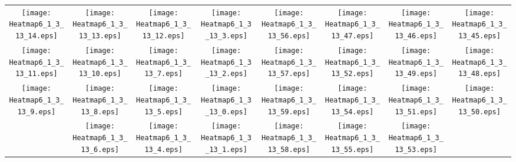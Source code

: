 \documentclass{standalone}
\begin{document}
\begin{tabular}{ *8{c} }
\texttt{[image: Heatmap6\_1\_3\_13\_14.eps]} & \texttt{[image: Heatmap6\_1\_3\_13\_13.eps]} & \texttt{[image: Heatmap6\_1\_3\_13\_12.eps]} & \texttt{[image: Heatmap6\_1\_3\_13\_3.eps]} & \texttt{[image: Heatmap6\_1\_3\_13\_56.eps]} & \texttt{[image: Heatmap6\_1\_3\_13\_47.eps]} & \texttt{[image: Heatmap6\_1\_3\_13\_46.eps]} & \texttt{[image: Heatmap6\_1\_3\_13\_45.eps]} \\
\texttt{[image: Heatmap6\_1\_3\_13\_11.eps]} & \texttt{[image: Heatmap6\_1\_3\_13\_10.eps]} & \texttt{[image: Heatmap6\_1\_3\_13\_7.eps]} & \texttt{[image: Heatmap6\_1\_3\_13\_2.eps]} & \texttt{[image: Heatmap6\_1\_3\_13\_57.eps]} & \texttt{[image: Heatmap6\_1\_3\_13\_52.eps]} & \texttt{[image: Heatmap6\_1\_3\_13\_49.eps]} & \texttt{[image: Heatmap6\_1\_3\_13\_48.eps]} \\
\texttt{[image: Heatmap6\_1\_3\_13\_9.eps]} & \texttt{[image: Heatmap6\_1\_3\_13\_8.eps]} & \texttt{[image: Heatmap6\_1\_3\_13\_5.eps]} & \texttt{[image: Heatmap6\_1\_3\_13\_0.eps]} & \texttt{[image: Heatmap6\_1\_3\_13\_59.eps]} & \texttt{[image: Heatmap6\_1\_3\_13\_54.eps]} & \texttt{[image: Heatmap6\_1\_3\_13\_51.eps]} & \texttt{[image: Heatmap6\_1\_3\_13\_50.eps]} \\
 & \texttt{[image: Heatmap6\_1\_3\_13\_6.eps]} & \texttt{[image: Heatmap6\_1\_3\_13\_4.eps]} & \texttt{[image: Heatmap6\_1\_3\_13\_1.eps]} & \texttt{[image: Heatmap6\_1\_3\_13\_58.eps]} & \texttt{[image: Heatmap6\_1\_3\_13\_55.eps]} & \texttt{[image: Heatmap6\_1\_3\_13\_53.eps]} &  
\end{tabular}
\end{document}
